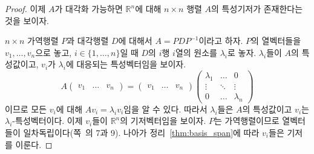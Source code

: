 \documentclass[unfonts,oneside,a4paper]{oblivoir}
\theoremstyle{definition}
\theoremstyle{theorem}
\theoremstyle{theorem}
\theoremstyle{remark}
\theoremstyle{remark}
\theoremstyle{remark}
\theoremstyle{remark}
\renewcommand{\vec}[1]{\bm{\mathit{#1}}}
\begin{document}
\begin{proof}
    이제 $A$가 대각화 가능하면 $\mathbb R^n$에 대해 $n \times n$ 행렬 $A$의 특성기저가 존재한다는 것을 보이자.

    $n \times n$ 가역행렬 $P$과 대각행렬 $D$에 대해서 $A = PDP^{-1}$이라고 하자.
    $P$의 열벡터들을 $\vec v_1, \dots, \vec v_n$으로 놓고, $i \in \{1, \dots, n\}$일 때 $D$의 $i$행 $i$열의 원소를 $\lambda_i$로 놓자.
    $\lambda_i$들이 $A$의 특성값이고, $\vec v_i$가 $\lambda_i$에 대응되는 특성벡터임을 보이자.
    \begin{equation*}
        A
        \begin{pmatrix}
            \vec v_1 & \dots & \vec v_n
        \end{pmatrix}
        =
        \begin{pmatrix}
            \vec v_1 & \dots & \vec v_n
        \end{pmatrix}
        \begin{pmatrix}
            \lambda_1 & \dots & 0\\
            \vdots & \ddots & \vdots\\
            0 & \dots & \lambda_n
        \end{pmatrix}
    \end{equation*}
    이므로 모든 $\vec v_i$에 대해 $A \vec v_i = \lambda_i \vec v_i$임을 알 수 있다.
    따라서 $\lambda_i$들은 $A$의 특성값이고 $\vec v_i$는 $\lambda_i$-특성벡터이다.
    이제 $\vec v_i$들이 $\mathbb R^n$의 기저벡터임을 보이자.
    $P$는 가역행렬이므로 열벡터들이 일차독립이다(쪽~\pageref{page:equiv_remark_update}의 7과 9).
    나아가 정리~\ref{thm:basis_span}에 따라 $\vec v_i$들은 기저를 이룬다.
\end{proof}
\end{document}
